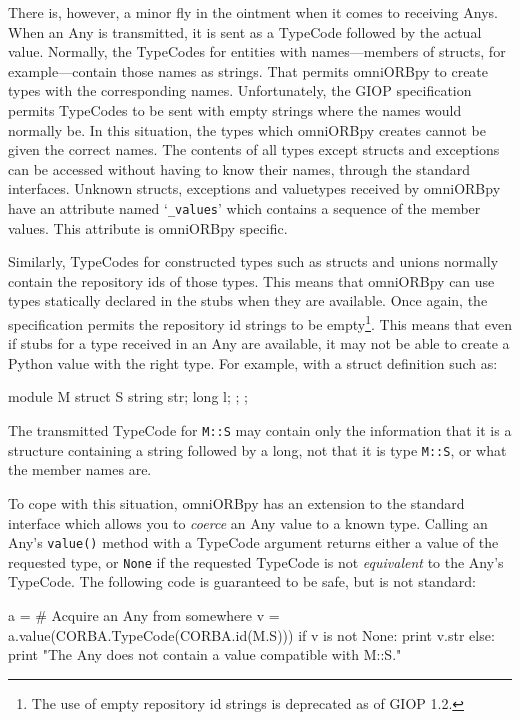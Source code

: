 \documentclass[11pt,oneside,a4paper]{book}
\newcommand{\type}[1]{\texttt{#1}}
\newcommand{\code}[1]{\texttt{#1}}
\newcommand{\op}[1]{\texttt{#1()}}
\newcommand{\term}[1]{\textit{#1}}
\begin{document}
There is, however, a minor fly in the ointment when it comes to
receiving Anys. When an Any is transmitted, it is sent as a TypeCode
followed by the actual value.  Normally, the TypeCodes for entities
with names---members of structs, for example---contain those names as
strings. That permits omniORBpy to create types with the corresponding
names. Unfortunately, the GIOP specification permits TypeCodes to be
sent with empty strings where the names would normally be. In this
situation, the types which omniORBpy creates cannot be given the
correct names. The contents of all types except structs and exceptions
can be accessed without having to know their names, through the
standard interfaces. Unknown structs, exceptions and valuetypes
received by omniORBpy have an attribute named `\code{\_values}' which
contains a sequence of the member values. This attribute is omniORBpy
specific.

Similarly, TypeCodes for constructed types such as structs and unions
normally contain the repository ids of those types. This means that
omniORBpy can use types statically declared in the stubs when they are
available. Once again, the specification permits the repository id
strings to be empty\footnote{The use of empty repository id strings is
deprecated as of GIOP 1.2.}. This means that even if stubs for a type
received in an Any are available, it may not be able to create a
Python value with the right type. For example, with a struct
definition such as:

\begin{idllisting}
module M {
  struct S {
    string str;
    long   l;
  };
};
\end{idllisting}

\noindent The transmitted TypeCode for \type{M::S} may contain only
the information that it is a structure containing a string followed by
a long, not that it is type \type{M::S}, or what the member names are.

To cope with this situation, omniORBpy has an extension to the
standard interface which allows you to \term{coerce} an Any value to a
known type. Calling an Any's \op{value} method with a TypeCode
argument returns either a value of the requested type, or \code{None}
if the requested TypeCode is not \term{equivalent} to the Any's
TypeCode. The following code is guaranteed to be safe, but is not
standard:

\begin{pylisting}
a = # Acquire an Any from somewhere
v = a.value(CORBA.TypeCode(CORBA.id(M.S)))
if v is not None:
    print v.str
else:
    print "The Any does not contain a value compatible with M::S."
\end{pylisting}
\end{document}
